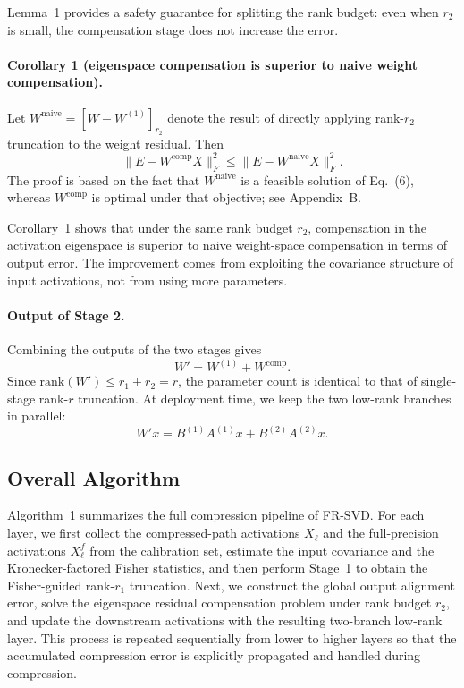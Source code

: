 \documentclass[a4paper,fleqn]{cas-dc}
\begin{document}
Lemma~1 provides a safety guarantee for splitting the rank budget: even when $r_2$ is small, the compensation stage does not increase the error.

\paragraph{Corollary 1 (eigenspace compensation is superior to naive weight compensation).}
Let $W^{\mathrm{naive}} = [W - W^{(1)}]_{r_2}$ denote the result of directly applying rank-$r_2$ truncation to the weight residual. Then
\begin{equation}
\|E - W^{\mathrm{comp}}X\|_F^2 \le \|E - W^{\mathrm{naive}}X\|_F^2.
\tag{10}
\end{equation}
The proof is based on the fact that $W^{\mathrm{naive}}$ is a feasible solution of Eq.~(6), whereas $W^{\mathrm{comp}}$ is optimal under that objective; see Appendix~B.

Corollary~1 shows that under the same rank budget $r_2$, compensation in the activation eigenspace is superior to naive weight-space compensation in terms of output error. The improvement comes from exploiting the covariance structure of input activations, not from using more parameters.

\paragraph{Output of Stage 2.}
Combining the outputs of the two stages gives
\begin{equation}
W' = W^{(1)} + W^{\mathrm{comp}}.
\tag{11}
\end{equation}
Since $\mathrm{rank}(W') \le r_1 + r_2 = r$, the parameter count is identical to that of single-stage rank-$r$ truncation. At deployment time, we keep the two low-rank branches in parallel:
\begin{equation}
W'x = B^{(1)}A^{(1)}x + B^{(2)}A^{(2)}x.
\end{equation}

\subsection{Overall Algorithm}

Algorithm~1 summarizes the full compression pipeline of FR-SVD. For each layer, we first collect the compressed-path activations $X_\ell$ and the full-precision activations $X_\ell^f$ from the calibration set, estimate the input covariance and the Kronecker-factored Fisher statistics, and then perform Stage~1 to obtain the Fisher-guided rank-$r_1$ truncation. Next, we construct the global output alignment error, solve the eigenspace residual compensation problem under rank budget $r_2$, and update the downstream activations with the resulting two-branch low-rank layer. This process is repeated sequentially from lower to higher layers so that the accumulated compression error is explicitly propagated and handled during compression.
\end{document}
